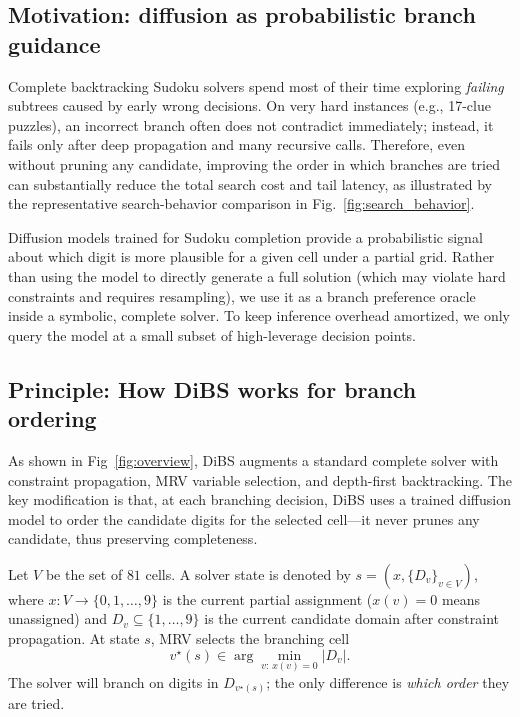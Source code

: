 \documentclass[lettersize,journal]{IEEEtran}
\begin{document}
\subsection{Motivation: diffusion as probabilistic branch guidance}
Complete backtracking Sudoku solvers spend most of their time exploring \emph{failing} subtrees caused by early wrong decisions.
On very hard instances (e.g., 17-clue puzzles), an incorrect branch often does not contradict immediately; instead, it fails only after deep propagation and many recursive calls.
Therefore, even without pruning any candidate, improving the order in
which branches are tried can substantially reduce the total
search cost and tail latency, as illustrated by the representative
search-behavior comparison in Fig.~\ref{fig:search_behavior}.

Diffusion models trained for Sudoku completion provide a probabilistic signal about which digit is more plausible for a given cell under a partial grid.
Rather than using the model to directly generate a full solution (which may violate hard constraints and requires resampling), we use it as a branch preference oracle inside a symbolic, complete solver.
To keep inference overhead amortized, we only query the model at a small subset of high-leverage decision points.

\subsection{Principle: How DiBS works for branch ordering}
As shown in Fig~\ref{fig:overview}, DiBS augments a standard complete solver with constraint propagation, MRV variable selection, and depth-first backtracking.
The key modification is that, at each branching decision, DiBS uses a trained diffusion model to order the candidate digits for the selected cell---it never prunes any candidate, thus preserving completeness.


Let $V$ be the set of $81$ cells.
A solver state is denoted by $s=(x,\{D_v\}_{v\in V})$, where $x:V\to\{0,1,\dots,9\}$ is the current partial assignment ($x(v)=0$ means unassigned) and $D_v\subseteq\{1,\dots,9\}$ is the current candidate domain after constraint propagation.
At state $s$, MRV selects the branching cell
\begin{equation}
	v^\star(s)\in \arg\min_{v:\,x(v)=0} |D_v|.
	\label{eq:mrv}
\end{equation}
The solver will branch on digits in $D_{v^\star(s)}$; the only difference is \emph{which order} they are tried.
\end{document}
